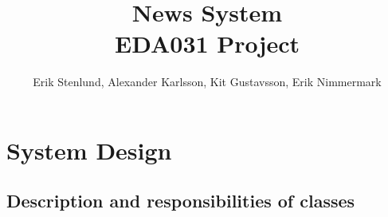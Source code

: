 \documentclass[a4paper]{article}
\title{News System \\
 EDA031 Project }
\author{Erik Stenlund, Alexander Karlsson, Kit Gustavsson, Erik Nimmermark}
\begin{document}
\maketitle                      %

%
%
%
%

\newpage
\section{System Design}
\subsection{Description and responsibilities of classes}             %
\end{document}

